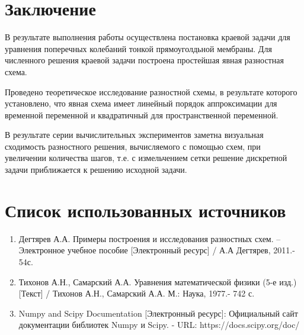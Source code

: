 {{		\newpage
	}
	




\titleformat{\section}{\large\bfseries\centering}{\thesection}{0.5em}{\MakeUppercase}
\section*{Заключение}
{
	В результате выполнения работы осуществлена постановка краевой
задачи для уравнения поперечных колебаний тонкой прямоуголдьной мембраны. Для
численного решения краевой задачи построена простейшая явная разностная схема.

Проведено теоретическое исследование разностной схемы, в результате
которого установлено, что явная схема имеет линейный
порядок аппроксимации для временной переменной и квадратичный для
пространственной переменной.

 
В результате серии вычислительных экспериментов заметна визуальная
сходимость разностного решения, вычисляемого с помощью схем, при
увеличении количества шагов, т.е. с измельчением сетки решение дискретной
задачи приближается к решению исходной задачи.
}

\newpage

\section*{Список использованных источников}
{
	\begin{enumerate}[label=\arabic*\ \ ]
	\item {Дегтярев А.А. Примеры построения и исследования разностных схем. – Электронное учебное пособие [Электронный ресурс] / А.А Дегтярев, 2011.- 54с.}
	\item {Тихонов А.Н., Самарский А.А. Уравнения математической физики (5-е изд.) [Текст] / Тихонов А.Н., Самарский А.А. М.: Наука, 1977.- 742 с.}
	
	\item {Numpy and Scipy Documentation [Электронный ресурс]: Официальный сайт документации библиотек Numpy и Scipy. - URL: https://docs.scipy.org/doc/}
	

\end{enumerate}}}
